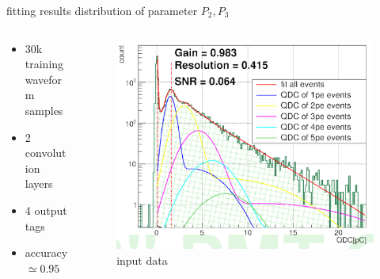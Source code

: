\documentclass[11pt,compress,xcolor=x11names,UTF8]{beamer}
\begin{document}
\begin{frame}{fitting results}
	distribution of parameter $P_{2},P_{3}$
\begin{columns}
\begin{column}{.47\textwidth}
\begin{itemize}
	\item 30k training waveform samples
	\item 2 convolution layers
	\item 4 output tags
	\item accuracy$\simeq 0.95$
	\end{itemize}
\end{column}
\begin{column}{.5\textwidth}
\begin{figure}
\centering
\includegraphics[width=\textwidth]{figure/mcpfit.png} %
\caption{input data}
\end{figure}
\end{column}
\end{columns}
\end{frame}
\end{document}
